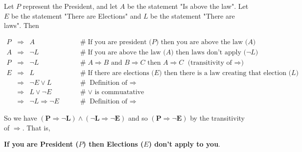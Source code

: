 \documentclass[11pt, oneside]{article}   	%
\theoremstyle{definition}
\begin{document}
\noindent
Let $P$ represent the President, and let $A$ be the statement "Is above the law". Let $E$ be the statement "There are Elections" and $L$ be the statement "There are laws".
Then

\begin{equation*}
\begin{array}{rcll}
P
&\Rightarrow& A                                              &\qquad \mathrel{\#} \text{If you are president ($P$) then you are above the law ($A$)}   \\
A &\Rightarrow& \neg L                                   &\qquad \mathrel{\#} \text{If you are above the law ($A$) then laws don't apply ($\neg L)$}  \\
P &\Rightarrow& \neg L                                   &\qquad \mathrel{\#} A \Rightarrow B \text{ and } B \Rightarrow C \text{ then } A \Rightarrow C \text { (transitivity of $\Rightarrow$)}  \\
E &\Rightarrow& L                                           &\qquad \mathrel{\#} \text{If there are elections ($E$) then there is a law creating that election ($L$)} \\
&\Rightarrow& \neg E \lor L                             &\qquad \mathrel{\#} \text{Definition of $\Rightarrow$}  \\
&\Rightarrow&  L \lor \neg E                            &\qquad \mathrel{\#} \text{$\lor$ is commuatative}  \\
&\Rightarrow&  \neg L \Rightarrow \neg E      &\qquad \mathrel{\#} \text{Definition of $\Rightarrow$}  
\end{array}
\end{equation*}


\bigskip
\noindent
So we have $\mathbf{(P \Rightarrow \neg L) \land ( \neg L \Rightarrow \neg E)}$  and so  $\mathbf{(P \Rightarrow \neg E)}$  by the transitivity of $\Rightarrow$.
That is,

\bigskip
\begin{center}
 {\bf \large If you are President ($P$) then Elections ($E$) don't apply to you}.
 \end{center}
\end{document}
